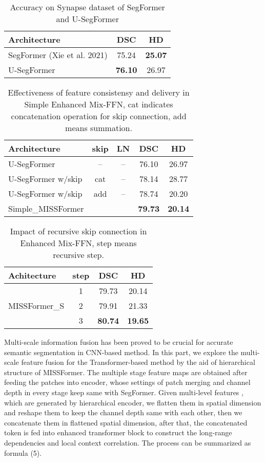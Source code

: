 \documentclass[letterpaper]{article} \usepackage{aaai22}  \usepackage{times}  \usepackage{helvet}  \usepackage{courier}  \usepackage[hyphens]{url}  \usepackage{graphicx} \urlstyle{rm} \def\UrlFont{\rm}  \usepackage{natbib}  \usepackage{caption} \DeclareCaptionStyle{ruled}{labelfont=normalfont,labelsep=colon,strut=off} \frenchspacing  \setlength{\pdfpagewidth}{8.5in}  \setlength{\pdfpageheight}{11in}  \usepackage{algorithm}
\begin{document}
\begin{table}[t]
	\centering
	\begin{tabular}{l|c|c}	
		\hline
		Architecture &DSC & HD \\
		\hline
		\hline
		SegFormer (Xie et al. 2021) &75.24 & \textbf{25.07}\\
		U-SegFormer& \textbf{76.10}& 26.97\\
		\hline
	\end{tabular}
	\caption{Accuracy on Synapse dataset of SegFormer and U-SegFormer}
	\label{table1}
\end{table}
\begin{table}[t]
	\centering
	\begin{tabular}{l|c|c|c|c}
		\hline
		Architecture & skip&  LN&DSC & HD \\
		\hline
		\hline
		U-SegFormer& --& --& 76.10 & 26.97\\
		U-SegFormer w/skip& cat& --& 78.14& 28.77\\
		U-SegFormer w/skip& add& --& 78.74& 20.20\\
		Simple\_MISSFormer& \checkmark& \checkmark& \textbf{79.73}& \textbf{20.14}\\
		\hline			
	\end{tabular}
\caption{Effectiveness of feature consistensy and delivery in Simple Enhanced Mix-FFN, cat indicates concatenation operation for skip connection, add means summation. }
	\label{table2}
\end{table}
\begin{table}[!h]
	\centering
	\begin{tabular}{l|c|c|c}
		\hline
		Achitecture & step &DSC & HD \\
		\hline
		\hline
\multirow{3}{*}{MISSFormer\_S}
		& 1& 79.73& 20.14	\\
		& 2& 79.91& 21.33	\\
		& 3& \textbf{80.74}& \textbf{19.65}	\\
		\hline	
	\end{tabular}
	\caption{Impact of recursive skip connection in Enhanced Mix-FFN, step means recursive step. }
	\label{table3}
\end{table}

Multi-scale information fusion has been proved to be crucial for accurate semantic segmentation in CNN-based method\cite{Sinha2020,Chen2017}. In this part, we explore the multi-scale feature fusion for the Transformer-based method by the aid of hierarchical structure of MISSFormer. The multiple stage feature maps are obtained after feeding the patches into encoder, whose settings of patch merging and channel depth in every stage keep same with SegFormer. Given multi-level features , which are generated by hierarchical encoder, we flatten them in spatial dimension and reshape them to keep the channel depth same with each other, then we concatenate them in flattened spatial dimension, after that, the concatenated token is fed into enhanced transformer block to construct the long-range dependencies and local context correlation. The process can be summarized as formula (5).
\end{document}
